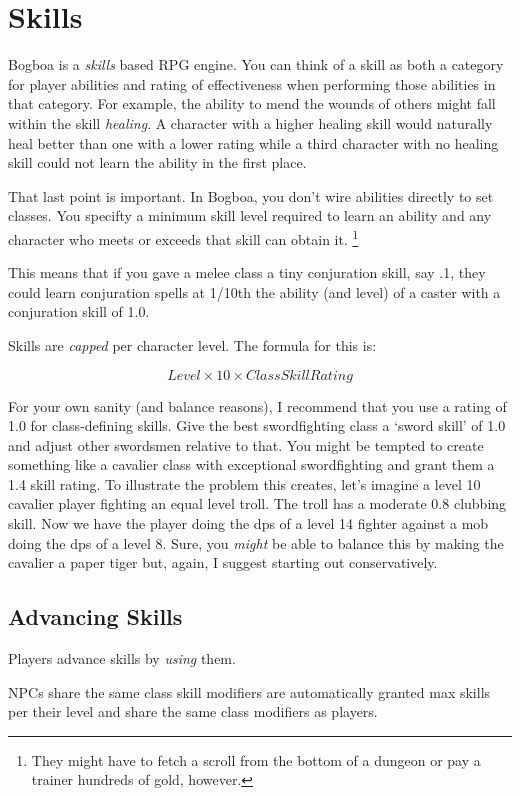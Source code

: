 \section{Skills}

Bogboa is a \emph{skills} based RPG engine.  You can think of a skill as both
a category for player abilities and rating of effectiveness when performing
those abilities in that category.  For example, the ability to mend the wounds
of others might fall within the skill \emph{healing}.  A character with a 
higher healing skill would naturally heal better than one with a lower rating
while a third character with no healing skill could not learn the ability in
the first place.

That last point is important.  In Bogboa, you don't wire abilities directly to
set classes.  You specifty a minimum skill level required to learn an ability
and any character who meets or exceeds that skill can obtain it.
\footnote{They might have to fetch a scroll from the bottom of a dungeon or 
pay a trainer hundreds of gold, however.}

This means that if you gave a melee class a tiny conjuration skill, say .1, 
they could learn conjuration spells at 1/10th the ability (and level) of a
caster with a conjuration skill of 1.0.

Skills are \emph{capped} per character level.  The formula for this is:

\[ Level \times 10 \times Class Skill Rating \]
      
For your own sanity (and balance reasons), I recommend that you use
a rating of 1.0 for class-defining skills.  Give the best swordfighting
class a `sword skill' of 1.0 and adjust other swordsmen relative to that.
You might be tempted to create something like a cavalier class with
exceptional swordfighting and grant them a 1.4 skill rating.  To illustrate
the problem this creates, let's imagine a level 10 cavalier player fighting
an equal level troll.  The troll has a moderate 0.8 clubbing skill.  Now we
have the player doing the dps of a level 14 fighter against a mob doing the
dps of a level 8.  Sure, you \emph{might} be able to balance this by making the
cavalier a paper tiger but, again, I suggest starting out conservatively.\\
    
\subsection{Advancing Skills}

Players advance skills by \emph{using} them.

NPCs share the same class skill modifiers are automatically granted max skills per their level and share the same
class modifiers as players.  
 

    

 

    
